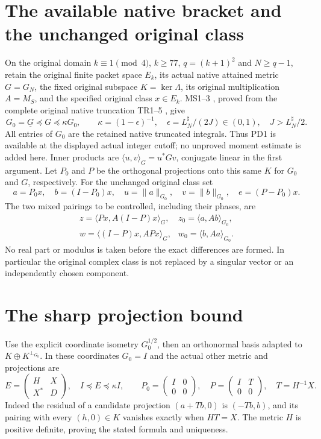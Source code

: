 \documentclass[11pt]{article}
\begin{document}
\section{The available native bracket and the unchanged original class}
On the original domain $k\equiv1\pmod4$, $k\ge77$, $q=(k+1)^2$
and $N\ge q-1$, retain the original finite packet space $E_k$, its actual native attained
metric $G=G_N$, the fixed original subspace $K=\ker\Lambda$, its original
multiplication $A=M_S$, and the specified original class $x\in E_k$.
MS1--3 \cite{mproj:MS}, proved from the complete original native truncation
TR1--5 \cite{mproj:TR}, give
\[
 G_0=\underline G\preceq G\preceq\kappa G_0,\qquad
 \kappa=(1-\epsilon)^{-1},\quad
 \epsilon=L_N^\sharp/(2J)\in(0,1),\quad J>L_N^\sharp/2.          \tag{PD1}
\]
All entries of $G_0$ are the retained native truncated integrals.
Thus PD1 is available at the displayed actual integer cutoff; no
unproved moment estimate is added here.  Inner products are
$\langle u,v\rangle_G=u^*Gv$, conjugate linear in the first argument.
Let $P_0$ and $P$ be the orthogonal projections onto this same $K$
for $G_0$ and $G$, respectively.  For the unchanged original class set
\[
 a=P_0x,\quad b=(I-P_0)x,\quad
 u=\|a\|_{G_0},\quad v=\|b\|_{G_0},\quad
 e=(P-P_0)x.
                                                                    \tag{PD2}
\]
The two mixed pairings to be controlled, including their phases, are
\[
 \begin{array}{ll}
 z=\langle Px,A(I-P)x\rangle_G,
   &z_0=\langle a,Ab\rangle_{G_0},\\
 w=\langle(I-P)x,APx\rangle_G,
   &w_0=\langle b,Aa\rangle_{G_0}.
 \end{array}                                                       \tag{PD3}
\]
No real part or modulus is taken before the exact differences are
formed.  In particular the original complex class is not replaced
by a singular vector or an independently chosen component.

\section{The sharp projection bound}
Use the explicit coordinate isometry $G_0^{1/2}$, then an orthonormal
basis adapted to $K\oplus K^{\perp_{G_0}}$.  In these coordinates
$G_0=I$ and the actual other metric and projections are
\[
 E=\begin{pmatrix}H&X\\X^*&D\end{pmatrix},\quad I\preceq E\preceq\kappa I,
 \qquad P_0=\begin{pmatrix}I&0\\0&0\end{pmatrix},\quad
 P=\begin{pmatrix}I&T\\0&0\end{pmatrix},\quad T=H^{-1}X.          \tag{PD4}
\]
Indeed the residual of a candidate projection $(a+Tb,0)$ is
$(-Tb,b)$, and its pairing with every $(h,0)\in K$ vanishes exactly
when $HT=X$.  The metric $H$ is positive definite, proving the
stated formula and uniqueness.
\end{document}

